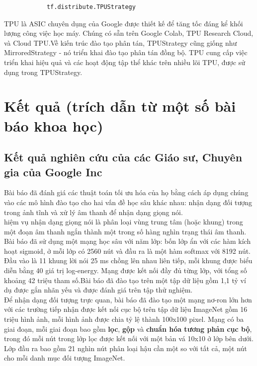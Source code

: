 \documentclass[11pt,a4paper]{article}
\numberwithin{equation}{subsection}
\numberwithin{figure}{subsection}
\numberwithin{table}{subsection}
\begin{document}
\lstset{language=Python}
\lstset{frame=lines}
\lstset{basicstyle=\footnotesize}
\begin{lstlisting}
			tf.distribute.TPUStrategy
\end{lstlisting}
TPU là ASIC chuyên dụng của Google được thiết kế để tăng tốc đáng kể khối lượng công việc học máy. Chúng có sẵn trên Google Colab, TPU Research Cloud, và Cloud TPU.Về kiến trúc đào tạo phân tán, TPUStrategy cũng giống như MirroredStrategy - nó triển khai đào tạo phân tán đồng bộ. TPU cung cấp việc triển khai hiệu quả và các hoạt động tập thể khác trên nhiều lõi TPU, được sử dụng trong TPUStrategy.

\newpage

\section{Kết quả (trích dẫn từ một số bài báo khoa học)}

\subsection{Kết quả nghiên cứu của các Giáo sư, Chuyên gia của Google Inc }
Bài báo đã đánh giá các thuật toán tối ưu hóa của họ bằng cách áp dụng chúng vào các mô hình đào tạo cho hai vấn đề học sâu khác nhau: nhận dạng đối tượng trong ảnh tĩnh và xử lý âm thanh để nhận dạng giọng nói.\\

hiệm vụ nhận dạng giọng nói là phân loại vùng trung tâm (hoặc khung) trong một đoạn âm thanh ngắn thành một trong số hàng nghìn trạng thái âm thanh. Bài báo đã sử dụng một mạng học sâu với năm lớp: bốn lớp ẩn với các hàm kích hoạt sigmoid, ở mỗi lớp có 2560 nút và đầu ra là một hàm softmax với 8192 nút. Đầu vào là 11 khung lời nói 25 ms chồng lên nhau liên tiếp, mỗi khung được biểu diễn bằng 40 giá trị log-energy. Mạng được kết nối đầy đủ từng lớp, với tổng số khoảng 42 triệu tham số.Bài báo đã đào tạo trên một tập dữ liệu gồm 1,1 tỷ ví dụ được gắn nhãn yếu và được đánh giá trên tập thử nghiệm.\\

Để nhận dạng đối tượng trực quan, bài báo đã đào tạo một mạng nơ-ron lớn hơn với các trường tiếp nhận được kết nối cục bộ trên tập dữ liệu ImageNet gồm 16 triệu hình ảnh, mỗi hình ảnh được chia tỷ lệ thành 100x100 pixel. Mạng có ba giai đoạn, mỗi giai đoạn bao gồm \textbf{lọc}, \textbf{gộp} và \textbf{chuẩn hóa tương phản cục bộ}, trong đó mỗi nút trong lớp lọc được kết nối với một bản vá 10x10 ở lớp bên dưới. Lớp đầu ra bao gồm 21 nghìn nút phân loại hậu cần một so với tất cả, một nút cho mỗi danh mục đối tượng ImageNet.\\
\end{document}
